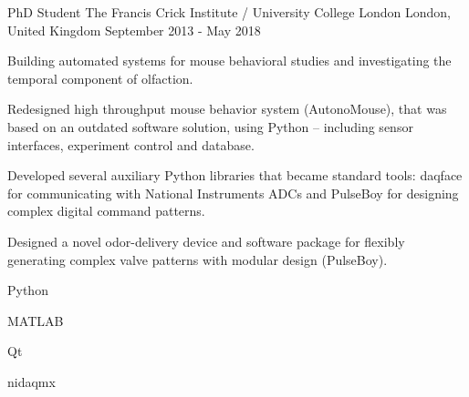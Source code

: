 \begin{cventries}
  \cventry%
    {PhD Student} %
    {The Francis Crick Institute / University College London} %
    {London, United Kingdom} %
    {September 2013 \-- May 2018} %
    {%
      \begin{cvsentence}Building automated systems for mouse behavioral studies and investigating the temporal component of olfaction.\end{cvsentence}
      \begin{cvitems} %
        \item {Redesigned high throughput mouse behavior system (AutonoMouse), that was based on an outdated software solution, using Python – including sensor interfaces, experiment control and database.}
        \item {Developed several auxiliary Python libraries that became standard tools: daqface for communicating with National Instruments ADCs and PulseBoy for designing complex digital command patterns.  }
        \item {Designed a novel odor-delivery device and software package for ﬂexibly generating complex valve patterns with modular design (PulseBoy).}
      \end{cvitems}
    }
    \begin{cventryskills}
      \item Python
      \item MATLAB
      \item Qt
      \item nidaqmx
    \end{cventryskills}
\end{cventries}
